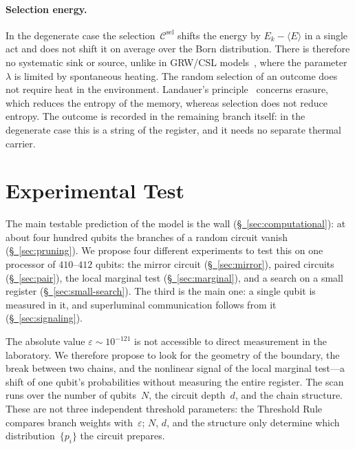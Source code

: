 \documentclass[11pt,a4paper]{article}
\newcommand{\CollapseRule}{Threshold Rule}
\begin{document}
\paragraph{Selection energy.}
In the degenerate case the selection~$\mathcal C^{\mathrm{sel}}$ shifts the energy by $E_k-\langle E\rangle$ in a single act and does not shift it on average over the Born distribution. There is therefore no systematic sink or source, unlike in GRW/CSL models~\cite{ghirardi1986,ghirardi1990,bassi2013}, where the parameter~$\lambda$ is limited by spontaneous heating. The random selection of an outcome does not require heat in the environment. Landauer's principle~\cite{landauer1961} concerns erasure, which reduces the entropy of the memory, whereas selection does not reduce entropy. The outcome is recorded in the remaining branch itself: in the degenerate case this is a string of the register, and it needs no separate thermal carrier.

\section{Experimental Test}
\label{sec:experiment}

The main testable prediction of the model is the wall (\hyperref[sec:computational]{\S~\ref*{sec:computational}}): at about four hundred qubits the branches of a random circuit vanish (\hyperref[sec:pruning]{\S~\ref*{sec:pruning}}). We propose four different experiments to test this on one processor of $410$--$412$ qubits: the mirror circuit (\hyperref[sec:mirror]{\S~\ref*{sec:mirror}}), paired circuits (\hyperref[sec:pair]{\S~\ref*{sec:pair}}), the local marginal test (\hyperref[sec:marginal]{\S~\ref*{sec:marginal}}), and a search on a small register (\hyperref[sec:small-search]{\S~\ref*{sec:small-search}}). The third is the main one: a single qubit is measured in it, and superluminal communication follows from it (\hyperref[sec:signaling]{\S~\ref*{sec:signaling}}).

The absolute value $\varepsilon\sim 10^{-121}$ is not accessible to direct measurement in the laboratory. We therefore propose to look for the geometry of the boundary, the break between two chains, and the nonlinear signal of the local marginal test---a shift of one qubit's probabilities without measuring the entire register. The scan runs over the number of qubits~$N$, the circuit depth~$d$, and the chain structure. These are not three independent threshold parameters: the \CollapseRule{} compares branch weights with~$\varepsilon$; $N$, $d$, and the structure only determine which distribution~$\{p_i\}$ the circuit prepares.
\end{document}
